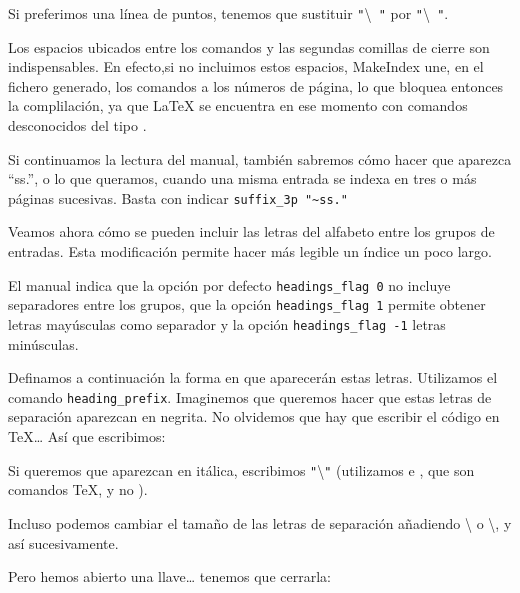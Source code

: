 Si preferimos una línea de puntos, tenemos que sustituir \verb|"|\textbackslash{}\verb| "| por \verb|"|\textbackslash{}\verb| "|.

\begin{attention}
Los espacios ubicados entre los comandos y las segundas comillas de cierre son indispensables. En efecto,si no incluimos estos espacios, MakeIndex une, en el fichero  generado, los comandos a los números de página, lo que bloquea entonces la complilación, ya que \LaTeX{} se encuentra en ese momento con comandos desconocidos del tipo .
\end{attention}

Si continuamos la lectura del manual, también sabremos cómo hacer que aparezca \enquote{ss.}, o lo que queramos, cuando una misma entrada se indexa en tres o más páginas sucesivas. Basta con indicar \verb+suffix_3p "~ss."+

Veamos ahora cómo se pueden incluir las letras del alfabeto entre los grupos de entradas. Esta modificación permite hacer más legible un índice un poco largo. 

El manual indica que la opción por defecto \verb+headings_flag 0+ no incluye separadores entre los grupos, que la opción \verb+headings_flag 1+ permite obtener letras mayúsculas como separador y la opción  \verb+headings_flag -1+ letras minúsculas.

Definamos a continuación la forma en que aparecerán estas letras. Utilizamos el comando \verb|heading_prefix|. Imaginemos que queremos hacer que estas letras de separación aparezcan en negrita. No olvidemos que hay que escribir el código en \TeX … Así que escribimos:

\begin{latexcode}
heading_prefix "{\\bfseries "
\end{latexcode} 

Si queremos que aparezcan en itálica, escribimos \verb|"|\textbackslash{}\verb|"| (utilizamos  e , que son comandos \TeX, y no  ).

Incluso podemos cambiar el tamaño de las letras de separación añadiendo \textbackslash{} o \textbackslash{}, y así sucesivamente. 

Pero hemos abierto una llave… tenemos que cerrarla:

\begin{latexcode}
heading_suffix " }\\nopagebreak\n " 
\end{latexcode}

